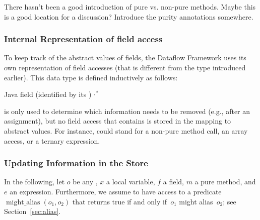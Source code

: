 \begin{workinprogress}
  There hasn't been a good introduction of pure vs. non-pure methods.
  Maybe this is a good location for a discussion?
  Introduce the purity annotations somewhere.
\end{workinprogress}


\subsubsection{Internal Representation of field access}
\label{sec:field-access}

To keep track of the abstract values of fields, the Dataflow Framework
uses its own representation of field accesses (that is different from
the  type introduced earlier).  This data type is defined
inductively as follows:

\begin{bnfgrammar}
        {  \qquad Java field (identified by its )}
        { \qquad {}}
        {  
            \literal{(} $^{,*}$ \literal{)}}
\end{bnfgrammar}

 is only used to determine which
information needs to be removed (e.g., after an assignment), but no field
access that contains  is stored in the mapping to
abstract values.  For instance,  could stand for
a non-pure method call, an array access, or a ternary expression.


\subsubsection{Updating Information in the Store}

\newcommand{\alias}{\operatorname{might\_alias}}

In the following, let $o$ be any , $x$ a local
variable, $f$ a field, $m$ a pure method, and $e$ an expression.
Furthermore, we assume to have access to a predicate $\alias(o_1,o_2)$
that returns true if and only if~$o_1$ might alias~$o_2$; see
Section~\ref{sec:alias}.

